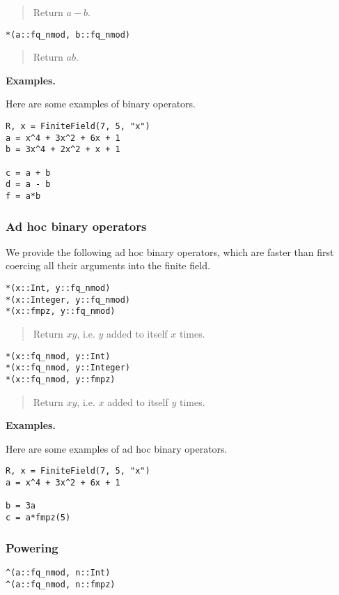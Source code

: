 \documentclass[a4paper,10pt]{article}
\newcommand{\desc}[1]{\vspace{-3mm}\begin{quote}#1\end{quote}}
\begin{document}
{{\desc{Return $a - b$.}

\begin{lstlisting}
*(a::fq_nmod, b::fq_nmod)
\end{lstlisting}

\desc{Return $ab$.}

\textbf{Examples.}

Here are some examples of binary operators.

\begin{lstlisting}
R, x = FiniteField(7, 5, "x")
a = x^4 + 3x^2 + 6x + 1
b = 3x^4 + 2x^2 + x + 1

c = a + b
d = a - b
f = a*b
\end{lstlisting}

\subsubsection{Ad hoc binary operators}

We provide the following ad hoc binary operators, which are faster than first
coercing all their arguments into the finite field.

\begin{lstlisting}
*(x::Int, y::fq_nmod)
*(x::Integer, y::fq_nmod)
*(x::fmpz, y::fq_nmod)
\end{lstlisting}

\desc{Return $xy$, i.e. $y$ added to itself $x$ times.}

\begin{lstlisting}
*(x::fq_nmod, y::Int)
*(x::fq_nmod, y::Integer)
*(x::fq_nmod, y::fmpz)
\end{lstlisting}

\desc{Return $xy$, i.e. $x$ added to itself $y$ times.}

\textbf{Examples.}

Here are some examples of ad hoc binary operators.

\begin{lstlisting}
R, x = FiniteField(7, 5, "x")
a = x^4 + 3x^2 + 6x + 1

b = 3a
c = a*fmpz(5)
\end{lstlisting}

\subsubsection{Powering}

\begin{lstlisting}
^(a::fq_nmod, n::Int)
^(a::fq_nmod, n::fmpz)
\end{lstlisting}

}}
\end{document}
